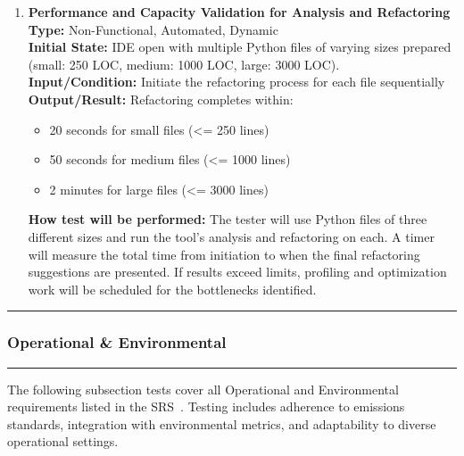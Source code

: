 \documentclass[12pt, titlepage]{article}
\newcommand{\colorrule}{\textcolor{BlueViolet}{\rule{\linewidth}{2pt}}}
\begin{document}
\begin{enumerate}[label={\bf \textcolor{Maroon}{test-PF-\arabic*}},
    wide=0pt, font=\itshape]
    
  \item \textbf{Performance and Capacity Validation for Analysis and Refactoring} \\[2mm]
    \textbf{Type:} Non-Functional, Automated, Dynamic \\
    \textbf{Initial State:} IDE open with multiple Python files of
    varying sizes prepared (small: 250 LOC, medium: 1000 LOC, large: 3000 LOC). \\
    \textbf{Input/Condition:} Initiate the refactoring process for
    each file sequentially \\
    \textbf{Output/Result:} Refactoring completes within:
    \begin{itemize}
      \item 20 seconds for small files (<= 250 lines)
      \item 50 seconds for medium files (<= 1000 lines)
      \item 2 minutes for large files (<= 3000 lines)
    \end{itemize}
    \textbf{How test will be performed:} The tester will use Python files of
    three different sizes and run the tool’s analysis and refactoring
    on each. A timer will measure the total time from initiation to
    when the final refactoring suggestions are presented. If results
    exceed limits, profiling and optimization work will be scheduled
    for the bottlenecks identified.

\end{enumerate}


  \noindent
  \colorrule

  \subsubsection{Operational \& Environmental}
  \colorrule

  \medskip

  \noindent
  The following subsection tests cover all Operational and
  Environmental requirements listed in the SRS~\cite{SRS}. Testing
  includes adherence to emissions standards, integration with
  environmental metrics, and adaptability to diverse operational settings.
\end{document}

